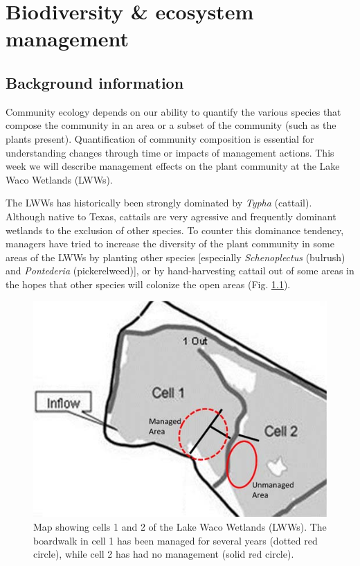\documentclass[]{book}
\begin{document}
\hypertarget{biodiversity-ecosystem-management}{%
\chapter{Biodiversity \& ecosystem management}\label{biodiversity-ecosystem-management}}

\hypertarget{background-information-2}{%
\section{Background information}\label{background-information-2}}

Community ecology depends on our ability to quantify the various species that compose the community in an area or a subset of the community (such as the plants present). Quantification of community composition is essential for understanding changes through time or impacts of management actions. This week we will describe management effects on the plant community at the Lake Waco Wetlands (LWWs).

The LWWs has historically been strongly dominated by \emph{Typha} (cattail). Although native to Texas, cattails are very agressive and frequently dominant wetlands to the exclusion of other species. To counter this dominance tendency, managers have tried to increase the diversity of the plant community in some areas of the LWWs by planting other species {[}especially \emph{Schenoplectus} (bulrush) and \emph{Pontederia} (pickerelweed){]}, or by hand-harvesting cattail out of some areas in the hopes that other species will colonize the open areas (Fig. \ref{fig:restoration-fig}).

\begin{figure}
\centering
\includegraphics{chapter_materials/restoration_ecology/lww_management.jpg}
\caption{\label{fig:restoration-fig}Map showing cells 1 and 2 of the Lake Waco Wetlands (LWWs). The boardwalk in cell 1 has been managed for several years (dotted red circle), while cell 2 has had no management (solid red circle).}
\end{figure}
\end{document}
